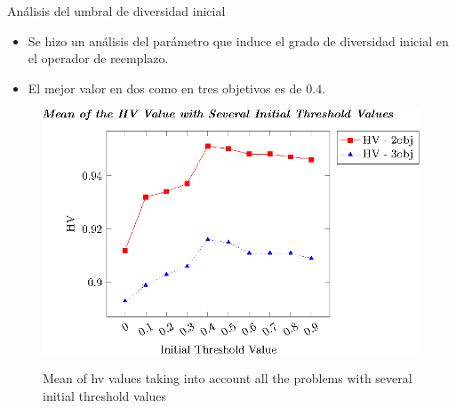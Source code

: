 \documentclass{beamer}
\newcommand{\HV}{{\sc hv}}
\begin{document}
\begin{frame}{Análisis del umbral de diversidad inicial}
\begin{itemize}
\item Se hizo un análisis del parámetro que induce el grado de diversidad inicial en el operador de reemplazo.
\item El mejor valor en dos como en tres objetivos es de $0.4$.
\end{itemize}
\begin{figure}[t]
\centering
\includegraphics[scale=0.85]{Images/Graphic-Initial-Distance_tikz-figure0.eps} \\
\caption{Mean of \HV{} values taking into account all the problems with several initial threshold values}\label{fig:Initial-distance-factor}
\end{figure}
\end{frame}
\end{document}
